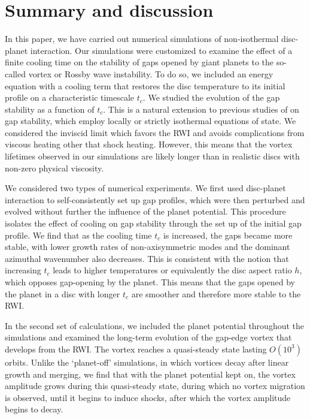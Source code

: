 \section{Summary and discussion}\label{summary}
In this paper, we have carried out numerical simulations of
non-isothermal disc-planet interaction.  
Our simulations were customized to examine the effect of a finite 
cooling time on the stability of gaps  
opened by giant planets to the so-called vortex or Rossby wave
instability. To do so, we  
included an energy equation with a cooling term that restores the 
disc temperature to its initial profile on a characteristic timescale
$t_c$. We studied the evolution of the gap stability as a function of 
$t_c$. This is a natural extension to previous studies of on gap
stability, which employ locally or strictly isothermal equations of
state. We considered the inviscid limit which favors the RWI
  \citep{li09,fu14} and avoids complications from viscous
  heating other that shock heating. However, this means that the vortex lifetimes observed in
  our simulations are likely longer than in realistic discs with
  non-zero physical viscosity.    	

We considered two types of numerical experiments. We first used
disc-planet interaction to self-consistently set up gap profiles,
which were then perturbed and evolved without further the influence of
the planet potential. This procedure isolates the effect of cooling on
gap stability through the set up of the initial gap profile. We find
that as the cooling time $t_c$ is increased, the gaps became more
stable, with lower growth rates of non-axisymmetric modes and the
dominant azimuthal wavenumber also decreases. This is consistent with
the notion that increasing $t_c$ leads to higher temperatures or
equivalently the disc aspect ratio $h$,
which opposes gap-opening by the planet. This means that the gaps
opened by the planet in a disc with longer $t_c$ are smoother and
therefore  more stable to the RWI. %

In the second set of calculations, we included the planet potential
throughout the simulations  and examined the long-term evolution of
the gap-edge vortex that develops from the RWI. The vortex reaches 
a quasi-steady state lasting $O(10^3)$ orbits. Unlike the `planet-off'
simulations, in which vortices decay after linear growth and merging,
we find that with the planet potential kept on, the vortex amplitude
grows during this quasi-steady state, during which no vortex migration is
  observed, until it begins to induce
shocks, after which the vortex amplitude begins to decay.   

